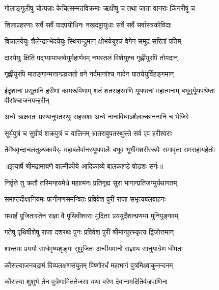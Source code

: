 \twolineshloka
{गोलाङ्गूलीषु चोत्पन्नाः केचित्सम्मतविक्रमाः}
{ऋक्षीषु च तथा जाता वानराः किंनरीषु च} %

\twolineshloka
{शिलाप्रहरणाः सर्वे सर्वे पादपयोधिनः}
{नखदंष्ट्रायुधाः सर्वे सर्वे सर्वास्त्रकोविदाः} %

\twolineshloka
{विचालयेयुः शैलेन्द्रान्भेदयेयुः स्थिरान्द्रुमान्}
{क्षोभयेयुश्च वेगेन समुद्रं सरितां पतिम्} %

\twolineshloka
{दारयेयुः क्षितिं पद्भ्यामाप्लवेयुर्महार्णवम्}
{नभस्तलं विशेयुश्च गृह्णीयुरपि तोयदान्} %

\twolineshloka
{गृह्णीयुरपि मातङ्गान्मत्तान्प्रव्रजतो वने}
{नर्दमानांश्च नादेन पातयेयुर्विहङ्गमान्} %

\threelineshloka
{ईदृशानां प्रसूतानि हरीणां कामरूपिणाम्}
{शतं शतसहस्राणि यूथपानां महात्मनाम्}
{बभूवुर्यूथपश्रेष्ठा वीरांश्चाजनयन्हरीन्} %

\twolineshloka
{अन्ये ऋक्षवतः प्रस्थानुपतस्थुः सहस्रशः}
{अन्ये नानाविधाञ्शैलान्काननानि च भेजिरे} %

\twolineshloka
{सूर्यपुत्रं च सुग्रीवं शक्रपुत्रं च वालिनम्}
{भ्रातरावुपतस्थुस्ते सर्व एव हरीश्वराः} %

\fourlineindentedshloka
{तैर्मेघवृन्दाचलतुल्यकायैर्-}
{महाबलैर्वानरयूथपालैः}
{बभूव भूर्भीमशरीररूपैः}
{समावृता रामसहायहेतोः} %


{॥इत्यार्षे श्रीमद्रामायणे वाल्मीकीये आदिकाव्ये बालकाण्डे षोडशः सर्गः॥}


\twolineshloka
{निर्वृत्ते तु क्रतौ तस्मिन्हयमेधे महात्मनः}
{प्रतिगृह्य सुरा भागान्प्रतिजग्मुर्यथागतम्} %

\twolineshloka
{समाप्तदीक्षानियमः पत्नीगणसमन्वितः}
{प्रविवेश पुरीं राजा सभृत्यबलवाहनः} %

\twolineshloka
{यथार्हं पूजितास्तेन राज्ञा वै पृथिवीश्वराः}
{मुदिताः प्रययुर्देशान्प्रणम्य मुनिपुङ्गवम्} %

\twolineshloka
{गतेषु पृथिवीशेषु राजा दशरथः पुनः}
{प्रविवेश पुरीं श्रीमान्पुरस्कृत्य द्विजोत्तमान्} %

\twolineshloka
{शान्तया प्रययौ सार्धमृष्यशृङ्गः सुपूजितः}
{अन्वीयमानो राज्ञाथ सानुयात्रेण धीमता} %

\twolineshloka
{कौसल्याजनयद्रामं दिव्यलक्षणसंयुतम्}
{विष्णोरर्धं महाभागं पुत्रमिक्ष्वाकुनन्दनम्} %

\twolineshloka
{कौसल्या शुशुभे तेन पुत्रेणामिततेजसा}
{यथा वरेण देवानामदितिर्वज्रपाणिना} %

